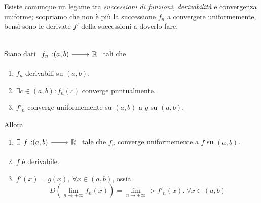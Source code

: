 Esiste comunque un legame tra \textit{successioni di funzioni}, \textit{derivabilità} e convergenza uniforme; scopriamo che non è più la successione $f_n$ a convergere uniformemente, bensì sono le derivate $f'$ della successioni a doverlo fare.
\begin{theorema}~{}\\
	Siano dati $\funz{f_n}{\left(a,b\right)}{\realset}$ tali che
	\begin{enumerate}
		\item $f_n$ derivabili su $\left(a,b\right)$.
		\item $\exists c\in\left(a,b\right)\colon f_n\left(c\right)$ converge puntualmente.
		\item $f'_n$ converge uniformemente su $\left(a,b\right)$ a $g$ su $\left(a,b\right)$.
	\end{enumerate}
Allora
\begin{enumerate}
	\item $\exists\funz{f}{\left(a,b\right)}{\realset}$ tale che $f_n$ converge uniformemente a $f$ su $\left(a,b\right)$.
	\item $f$ è derivabile.
	\item $f'\left(x\right)=g\left(x\right),\ \forall x\in \left(a,b\right)$, ossia
	\begin{equation}
		D\left(\lim_{n\to+\infty}f_n\left(x\right)\right)=\lim_{n\to+\infty}>f'_n\left(x\right).\ \forall x\in\left(a,b\right)
	\end{equation}
\end{enumerate}
\end{theorema}
\begin{demonstration}
\end{demonstration}